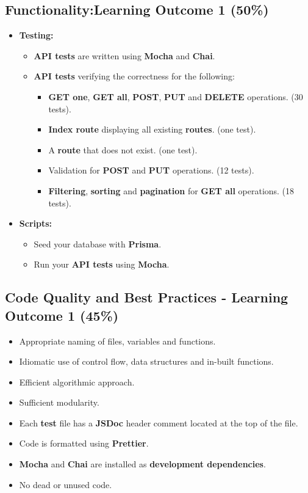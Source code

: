 \documentclass{article}
\begin{document}
\subsection*{Functionality:Learning Outcome 1 (50\%)}
\begin{itemize}
  \item \textbf{Testing:}
	\begin{itemize}
    \item \textbf{API tests} are written using \textbf{Mocha} and \textbf{Chai}.
    \item \textbf{API tests} verifying the correctness for the following:
      \begin{itemize}
        \item \textbf{GET one}, \textbf{GET all}, \textbf{POST}, \textbf{PUT} and \textbf{DELETE} operations. (30 tests).
        \item \textbf{Index route} displaying all existing \textbf{routes}. (one test).
        \item A \textbf{route} that does not exist. (one test).
        \item Validation for \textbf{POST} and \textbf{PUT} operations. (12 tests).
        \item \textbf{Filtering}, \textbf{sorting} and \textbf{pagination} for \textbf{GET all} operations. (18 tests).
      \end{itemize}
	\end{itemize}

	\item \textbf{Scripts:}
	\begin{itemize}
    \item Seed your database with \textbf{Prisma}.
		\item Run your \textbf{API tests} using \textbf{Mocha}.
	\end{itemize}
\end{itemize}

\subsection*{Code Quality and Best Practices - Learning Outcome 1 (45\%)}
\begin{itemize}
  \item Appropriate naming of files, variables and functions.
	\item Idiomatic use of control flow, data structures and in-built functions.
  \item Efficient algorithmic approach.
  \item Sufficient modularity.
	\item Each \textbf{test} file has a \textbf{JSDoc} header comment located at the top of the file.
	\item Code is formatted using \textbf{Prettier}.
	\item \textbf{Mocha} and \textbf{Chai} are installed as \textbf{development dependencies}.	
  \item No dead or unused code.
\end{itemize} 
\end{document}
